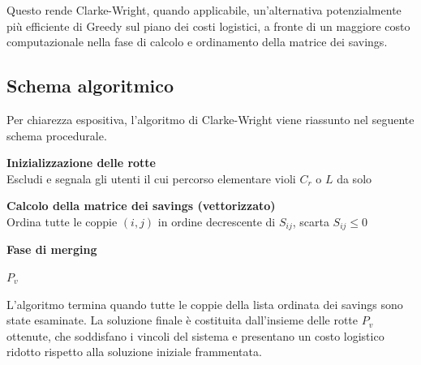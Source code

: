 Questo rende Clarke-Wright, quando applicabile, un'alternativa potenzialmente più efficiente di Greedy sul piano dei costi logistici, a fronte di un maggiore costo computazionale nella fase di calcolo e ordinamento della matrice dei savings.

\subsection{Schema algoritmico}

Per chiarezza espositiva, l'algoritmo di Clarke-Wright viene riassunto nel seguente schema procedurale.

\begin{algorithm}[H]
	\caption{Euristica Clarke-Wright Savings}
	
	\BlankLine
	\textbf{Inizializzazione delle rotte}\\
	Escludi e segnala gli utenti il cui percorso elementare violi $C_r$ o $L$ da solo\;
	
	\BlankLine
	\textbf{Calcolo della matrice dei savings (vettorizzato)}\\
	Ordina tutte le coppie $(i,j)$ in ordine decrescente di $S_{ij}$, scarta $S_{ij}\leq 0$\;
	
	\BlankLine
	\textbf{Fase di merging}\\
	
	\BlankLine
	\Return $P_v$\;
\end{algorithm}

L'algoritmo termina quando tutte le coppie della lista ordinata dei savings sono state esaminate. La soluzione finale è costituita dall'insieme delle rotte $P_v$ ottenute, che soddisfano i vincoli del sistema e presentano un costo logistico ridotto rispetto alla soluzione iniziale frammentata.

